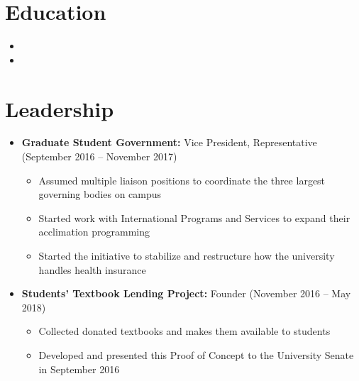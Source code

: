 \documentclass[10pt,a4paper,sans]{moderncv}        %
\begin{document}
\vspace{2pt}



\section{Education}

\vspace{5pt}

\begin{itemize}

\item{}
\item{}

\end{itemize}

\vspace{2pt}


\section{Leadership}

\vspace{6pt}

\begin{itemize}

\item \textbf{Graduate Student Government:} Vice President, Representative (September 2016 -- November 2017)
\begin{itemize}
	\item Assumed multiple liaison positions to coordinate the three largest governing bodies on campus
	\item Started work with International Programs and Services to expand their acclimation programming
	\item Started the initiative to stabilize and restructure how the university handles health insurance
\end{itemize}

\vspace{6pt}

\item \textbf{Students' Textbook Lending Project:} Founder (November 2016 -- May 2018)
\begin{itemize}
	\item Collected donated textbooks and makes them available to students
	\item Developed and presented this Proof of Concept to the University Senate in September 2016
\end{itemize}

\end{itemize}
\end{document}
